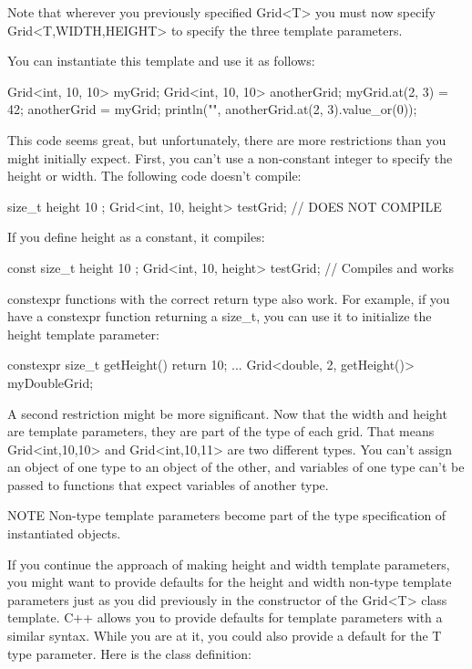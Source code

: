Note that wherever you previously specified Grid<T> you must now specify Grid<T,WIDTH,HEIGHT> to specify the three template parameters.

You can instantiate this template and use it as follows:

\begin{cpp}
Grid<int, 10, 10> myGrid;
Grid<int, 10, 10> anotherGrid;
myGrid.at(2, 3) = 42;
anotherGrid = myGrid;
println("{}", anotherGrid.at(2, 3).value_or(0));
\end{cpp}

This code seems great, but unfortunately, there are more restrictions than you might initially expect. First, you can’t use a non-constant integer to specify the height or width. The following code doesn’t compile:

\begin{cpp}
size_t height { 10 };
Grid<int, 10, height> testGrid; // DOES NOT COMPILE
\end{cpp}

If you define height as a constant, it compiles:

\begin{cpp}
const size_t height { 10 };
Grid<int, 10, height> testGrid; // Compiles and works
\end{cpp}

constexpr functions with the correct return type also work. For example, if you have a constexpr function returning a size\_t, you can use it to initialize the height template parameter:

\begin{cpp}
constexpr size_t getHeight() { return 10; }
...
Grid<double, 2, getHeight()> myDoubleGrid;
\end{cpp}

A second restriction might be more significant. Now that the width and height are template parameters, they are part of the type of each grid. That means Grid<int,10,10> and Grid<int,10,11> are two different types. You can’t assign an object of one type to an object of the other, and variables of one type can’t be passed to functions that expect variables of another type.

\begin{myNotic}{NOTE}
Non-type template parameters become part of the type specification of instantiated objects.
\end{myNotic}


If you continue the approach of making height and width template parameters, you might want to provide defaults for the height and width non-type template parameters just as you did previously in the constructor of the Grid<T> class template. C++ allows you to provide defaults for template parameters with a similar syntax. While you are at it, you could also provide a default for the T type parameter. Here is the class definition:

